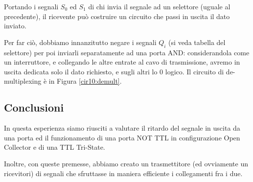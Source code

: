 Portando i segnali $S_0$ ed $S_1$ di chi invia il segnale ad un selettore (uguale al precedente), il ricevente può costruire un circuito che passi in uscita il dato inviato.

Per far ciò, dobbiamo innanzitutto negare i segnali $Q_i$ (si veda tabella del selettore) per poi inviarli separatamente ad una porta AND: considerandola come un interruttore, e collegando le altre entrate al cavo di trasmissione, avremo in uscita dedicata solo il dato richiesto, e sugli altri lo 0 logico.
Il circuito di de-multiplexing è in Figura \ref{cir10:demult}.

\subsection*{Conclusioni}

In questa esperienza siamo riusciti a valutare il ritardo del segnale in uscita da una porta ed il funzionamento di una porta NOT TTL in configurazione Open Collector e di una TTL Tri-State.

Inoltre, con queste premesse, abbiamo creato un trasmettitore (ed ovviamente un ricevitori) di segnali che sfruttasse in maniera efficiente i collegamenti fra i due.